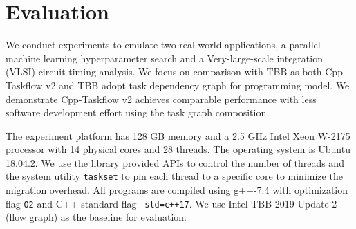 \documentclass[conference]{IEEEtran}
\begin{document}
\section{Evaluation}
We conduct experiments to emulate two real-world applications, 
a parallel machine learning hyperparameter
search and a 
Very-large-scale integration (VLSI) circuit timing analysis. 
We focus on comparison with TBB as both Cpp-Taskflow v2 and TBB 
adopt task dependency graph for programming model. 
We demonstrate Cpp-Taskflow v2 achieves comparable performance with less software development effort using 
the task graph composition.


The experiment platform has 128 GB memory and a 2.5 GHz Intel Xeon W-2175 processor with 14 physical cores 
and 28 threads. The operating system is Ubuntu 18.04.2. We use the library provided APIs to
control the number of threads and the system utility \lstinline{taskset}
to pin each thread to a specific core to minimize the migration overhead.  
All programs are compiled using g++-7.4 with optimization flag \lstinline{O2} and
C++ standard flag \lstinline{-std=c++17}. 
We use Intel TBB 2019 Update 2 (flow graph) as the baseline for evaluation. 


\end{document}
